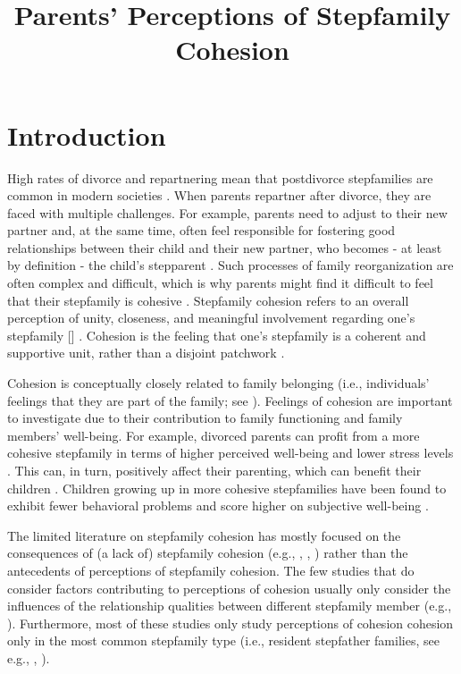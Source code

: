 \documentclass[\pandocDocMode,longtable,floatsintext]{apa6}
\title{Parents' Perceptions of Stepfamily Cohesion}
\affiliation{Utrecht University}
\begin{document}
\maketitle

\hypertarget{introduction}{%
\section{Introduction}\label{introduction}}

High rates of divorce and repartnering mean that postdivorce
stepfamilies are common in modern societies
\autocite{raley_divorce_2020}. When parents repartner after divorce,
they are faced with multiple challenges. For example, parents need to
adjust to their new partner and, at the same time, often feel
responsible for fostering good relationships between their child and
their new partner, who becomes - at least by definition - the child's
stepparent \autocite{jensen2017transitioning}. Such processes of family
reorganization are often complex and difficult, which is why parents
might find it difficult to feel that their stepfamily is cohesive
\autocite{ganong2019stepfathers} \autocite{pink1985problem}
\autocite{waldren1990cohesion}. Stepfamily cohesion refers to an overall
perception of unity, closeness, and meaningful involvement regarding
one's stepfamily
{[}\textcite{komter2006strength}{]}\autocite{waldren1990cohesion}
\autocite{jensen2022associations}. Cohesion is the feeling that one's
stepfamily is a coherent and supportive unit, rather than a disjoint
patchwork \autocite{favez2015coparenting}.

Cohesion is conceptually closely related to family belonging (i.e.,
individuals' feelings that they are part of the family; see
\autocite{king2015adolescents}). Feelings of cohesion are important to
investigate due to their contribution to family functioning and family
members' well-being. For example, divorced parents can profit from a
more cohesive stepfamily in terms of higher perceived well-being and
lower stress levels \autocite{waldren1990cohesion}. This can, in turn,
positively affect their parenting, which can benefit their children
\autocite{king2015adolescents}. Children growing up in more cohesive
stepfamilies have been found to exhibit fewer behavioral problems and
score higher on subjective well-being \autocite{shigeto2014roles}.

The limited literature on stepfamily cohesion has mostly focused on the
consequences of (a lack of) stepfamily cohesion (e.g.,
\autocite{duncan1994effects}, \autocite{hong2015interactive},
\autocite{shigeto2014roles}) rather than the antecedents of perceptions
of stepfamily cohesion. The few studies that do consider factors
contributing to perceptions of cohesion usually only consider the
influences of the relationship qualities between different stepfamily
member (e.g., \autocite{jensen2022associations}). Furthermore, most of
these studies only study perceptions of cohesion cohesion only in the
most common stepfamily type (i.e., resident stepfather families, see
e.g., \autocite{favez2015coparenting}, \autocite{waldren1990cohesion}).
\end{document}
